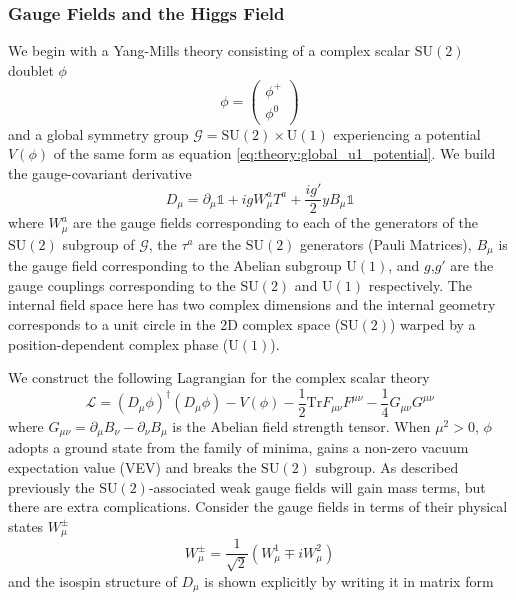 \subsubsection{Gauge Fields and the Higgs Field}
We begin with a Yang-Mills theory consisting of a complex scalar $\mathrm{SU}(2)$ doublet $\phi$ 
\begin{equation}
    \label{eq:theory:higgs_doublet}
    \phi = \begin{pmatrix}
        \phi^{+} \\
        \phi^{0}
    \end{pmatrix}
\end{equation}
and a global symmetry group $\mathcal{G}=\mathrm{SU}(2)\times\mathrm{U}(1)$ experiencing a potential $V(\phi)$ of the same form as equation \ref{eq:theory:global_u1_potential}. We build the gauge-covariant derivative 
\begin{equation}
    \label{eq:theory:electroweak_cov_deriv}
    D_{\mu} = \partial_{\mu}\mathbb{1} + {ig}W_{\mu}^{a}T^{a} + \frac{ig'}{2}yB_{\mu}\mathbb{1}
\end{equation}
where $W_{\mu}^{a}$ are the gauge fields corresponding to each of the generators of the $\mathrm{SU}(2)$ subgroup of $\mathcal{G}$, the $\tau^{a}$ are the $\mathrm{SU}(2)$ generators (Pauli Matrices), $B_{\mu}$ is the gauge field corresponding to the Abelian subgroup $\mathrm{U}(1)$, and $g$,$g'$ are the gauge couplings corresponding to the $\mathrm{SU}(2)$ and $\mathrm{U}(1)$ respectively. 
The internal field space here has two complex dimensions and the internal geometry corresponds to a unit circle in the 2D complex space ($\mathrm{SU}(2)$) warped by a position-dependent complex phase ($\mathrm{U}(1)$).


We construct the following Lagrangian for the complex scalar theory
\begin{equation}
    \label{eq:theory:electroweak_scalar_lagrangian}
    \mathcal{L} = (D_{\mu}\phi)^{\dag}(D_{\mu}\phi) - V(\phi) - \frac{1}{2}\mathrm{Tr}F_{\mu\nu}F^{\mu\nu} - \frac{1}{4}G_{\mu\nu}G^{\mu\nu}
\end{equation}
where $G_{\mu\nu} = \partial_{\mu}B_{\nu} - \partial_{\nu}B_{\mu}$ is the Abelian field strength tensor.
When $\mu^{2} > 0$, $\phi$ adopts a ground state from the family of minima, gains a non-zero vacuum expectation value (VEV) and breaks the $\mathrm{SU}(2)$ subgroup. 
As described previously the $\mathrm{SU}(2)$-associated weak gauge fields will gain mass terms, but there are extra complications. Consider the gauge fields in terms of their physical states $W_{\mu}^{\pm}$
\begin{equation}
    \label{eq:theory:physical_W_states}
    W^{\pm}_{\mu} = \frac{1}{\sqrt{2}}(W^{1}_{\mu}{\mp}iW^{2}_{\mu})
\end{equation}
and the isospin structure of $D_{\mu}$ is shown explicitly by writing it in matrix form

